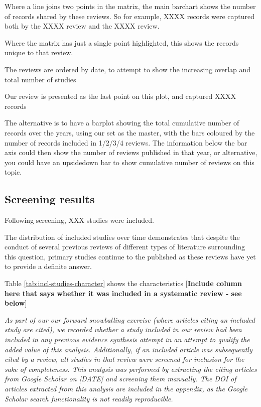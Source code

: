\documentclass[a4paper, twoside]{templates/ociamthesis}
\begin{document}
Where a line joins two points in the matrix, the main barchart shows the number of records shared by these reviews. So for example, XXXX records were captured both by the XXXX review and the XXXX review.

Where the matrix has just a single point highlighted, this shows the records unique to that review.

The reviews are ordered by date, to attempt to show the increasing overlap and total number of studies

Our review is presented as the last point on this plot, and captured XXXX records

The alternative is to have a barplot showing the total cumulative number of records over the years, using our set as the master, with the bars coloured by the number of records included in 1/2/3/4 reviews. The information below the bar axis could then show the number of reviews published in that year, or alternative, you could have an upsidedown bar to show cumulative number of reviews on this topic.

\hypertarget{screening-results}{%
\subsection{Screening results}\label{screening-results}}

Following screening, XXX studies were included.

The distribution of included studies over time demonstrates that despite the conduct of several previous reviews of different types of literature surrounding this question, primary studies continue to the published as these reviews have yet to provide a definite answer.

Table \ref{tab:incl-studies-character} shows the characteristics {[}\textbf{Include column here that says whether it was included in a systematic review - see below}{]}

\emph{As part of our our forward snowballing exercise (where articles citing an included study are cited), we recorded whether a study included in our review had been included in any previous evidence synthesis attempt in an attempt to qualify the added value of this analysis. Additionally, if an included article was subsequently cited by a review, all studies in that review were screened for inclusion for the sake of completeness. This analysis was performed by extracting the citing articles from Google Scholar on {[}DATE{]} and screening them manually. The DOI of articles extracted from this analysis are included in the appendix, as the Google Scholar search functionality is not readily reproducible.}
\end{document}

